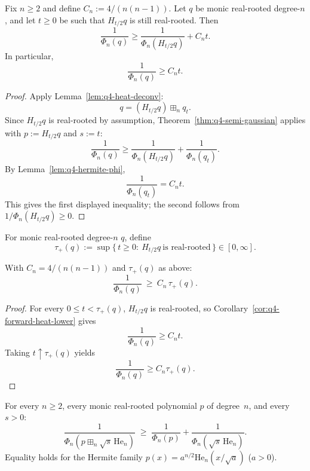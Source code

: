 \begin{corollary}\label{cor:q4-forward-heat-lower}
Fix $n\ge 2$ and define $C_n:=4/(n(n-1))$.
Let $q$ be monic real-rooted degree-$n$, and let $t\ge 0$ be such that
$H_{t/2}q$ is still real-rooted. Then
\[
\frac1{\Phi_n(q)}
\ge
\frac1{\Phi_n(H_{t/2}q)} + C_n t.
\]
In particular,
\[
\frac1{\Phi_n(q)}\ge C_n t.
\]
\end{corollary}

\begin{proof}
Apply Lemma~\ref{lem:q4-heat-deconv}:
\[
q=(H_{t/2}q)\boxplus_n q_t.
\]
Since $H_{t/2}q$ is real-rooted by assumption, Theorem~\ref{thm:q4-semi-gaussian}
applies with $p:=H_{t/2}q$ and $s:=t$:
\[
\frac1{\Phi_n(q)}
\ge
\frac1{\Phi_n(H_{t/2}q)}+\frac1{\Phi_n(q_t)}.
\]
By Lemma~\ref{lem:q4-hermite-phi},
\[
\frac1{\Phi_n(q_t)}=C_n t.
\]
This gives the first displayed inequality; the second follows from
$1/\Phi_n(H_{t/2}q)\ge 0$.
\end{proof}

\begin{definition}\label{def:q4-forward-time}
For monic real-rooted degree-$n$ $q$, define
\[
\tau_+(q):=
\sup\{\,t\ge 0:\ H_{t/2}q\ \text{is real-rooted}\,\}\in[0,\infty].
\]
\end{definition}

\begin{proposition}\label{prop:q4-forward-time-bound}
With $C_n=4/(n(n-1))$ and $\tau_+(q)$ as above:
\[
\frac1{\Phi_n(q)}\ \ge\ C_n\,\tau_+(q).
\]
\end{proposition}

\begin{proof}
For every $0\le t<\tau_+(q)$, $H_{t/2}q$ is real-rooted, so
Corollary~\ref{cor:q4-forward-heat-lower} gives
\[
\frac1{\Phi_n(q)}\ge C_n t.
\]
Taking $t\uparrow\tau_+(q)$ yields
\[
\frac1{\Phi_n(q)}\ge C_n\tau_+(q).
\]
\end{proof}

\begin{theorem}\label{thm:q4-semi-gaussian}
For every $n\ge 2$, every monic real-rooted polynomial $p$ of degree~$n$,
and every $s>0$:
\[
\frac{1}{\Phi_n(p\boxplus_n\sqrt{s}\,\mathrm{He}_n)}
\;\ge\;
\frac{1}{\Phi_n(p)}+\frac{1}{\Phi_n(\sqrt{s}\,\mathrm{He}_n)}.
\]
Equality holds for the Hermite family
$p(x)=a^{n/2}\mathrm{He}_n(x/\sqrt a)$ ($a>0$).
\end{theorem}

